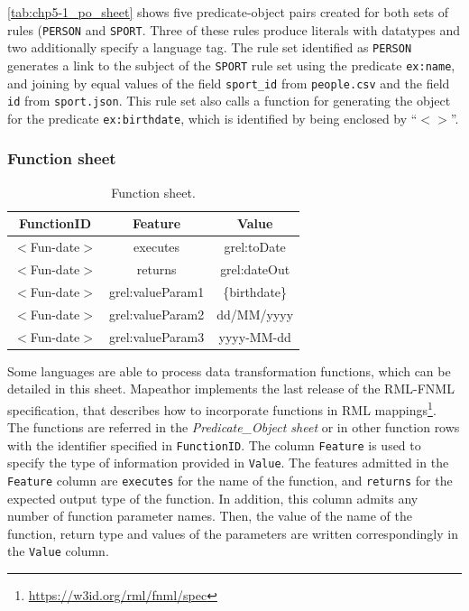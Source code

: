 \cref{tab:chp5-1_po_sheet} shows five predicate-object pairs created for both sets of rules (\texttt{PERSON} and \texttt{SPORT}. Three of these rules produce literals with datatypes and two additionally specify a language tag. The rule set identified as \texttt{PERSON} generates a link to the subject of the \texttt{SPORT} rule set using the predicate \texttt{ex:name}, and joining by equal values of the field \texttt{sport\_id} from \texttt{people.csv} and the field \texttt{id} from \texttt{sport.json}. This rule set also calls a function for generating the object for the predicate \texttt{ex:birthdate}, which is identified by being enclosed by ``$<>$''.

\subsubsection{Function sheet}
\hspace{0.1cm}

\begin{table}[h]
\caption{Function sheet.}
\label{tab:chp5-1_function_sheet}
\centering
\begin{tabular}{c|c|c}
\midrule
\textbf{FunctionID} & \textbf{Feature} & \textbf{Value} \\ \midrule
$<$Fun-date$>$ & executes & grel:toDate \\  
$<$Fun-date$>$ & returns & grel:dateOut \\  
$<$Fun-date$>$ & grel:valueParam1 & \{birthdate\} \\
$<$Fun-date$>$ & grel:valueParam2 & dd/MM/yyyy \\
$<$Fun-date$>$ & grel:valueParam3 & yyyy-MM-dd \\
\midrule
\end{tabular}
\end{table}


 Some languages are able to process data transformation functions, which can be detailed in this sheet. Mapeathor implements the last release of the RML-FNML specification, that describes how to incorporate functions in RML mappings\footnote{\url{https://w3id.org/rml/fnml/spec}}. The functions are referred in the \textit{Predicate\_Object sheet} or in other function rows with the identifier specified in \texttt{FunctionID}. The column \texttt{Feature} is used to specify the type of information provided in \texttt{Value}. The features admitted in the \texttt{Feature} column are \texttt{executes} for the name of the function, and \texttt{returns} for the expected output type of the function. In addition, this column admits any number of function parameter names. Then, the value of the name of the function, return type and values of the parameters are written correspondingly in the \texttt{Value} column.

